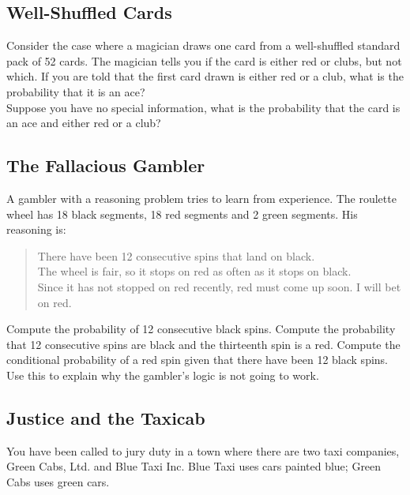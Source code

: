 \documentclass[12pt]{amsart}
\theoremstyle{definition}
\begin{document}
\vspace{1cm}

\subsection*{Well-Shuffled Cards}
Consider the case where a magician draws one card from a well-shuffled standard pack of 52 cards. The magician tells you if the card is either red or clubs, but not which.  If you are told that the first card drawn is either red or a club, what is the probability that it is an ace?\\

Suppose you have no special information, what is the probability that the card is an ace and either red or a club?\\

\vspace{1cm}



\clearpage



\subsection*{The Fallacious Gambler} A gambler with a reasoning problem tries to learn from experience. The roulette wheel has 18 black segments, 18 red segments and 2 green segments. His reasoning is:
\begin{quotation}
There have been 12 consecutive spins that land on black.\\
The wheel is fair, so it stops on red as often as it stops on black. \\
Since it has not stopped on red recently, red must come up soon. I will bet on red.
\end{quotation}
Compute the probability of 12 consecutive black spins. Compute the probability that 12 consecutive spins are black and the thirteenth spin is a red. Compute the conditional probability of a red spin given that there have been 12 black spins.\\
Use this to explain why the gambler's logic is not going to work.

\vspace{1cm}

\subsection*{Justice and the Taxicab} 
You have been called to jury duty in a town where there are two taxi companies, Green Cabs, Ltd. and Blue Taxi Inc. Blue Taxi uses cars painted blue; Green Cabs uses green cars.
\end{document}

